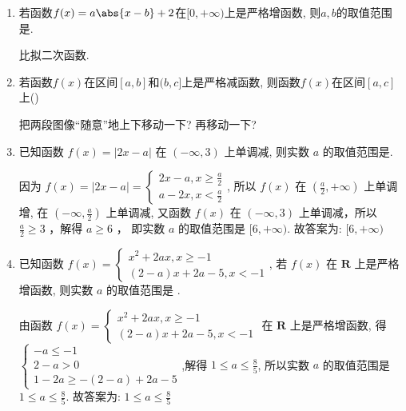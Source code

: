 \begin{enumerate}
\item 若函数$f(x)=a\abs{x-b}+2$在$[0,+\infty)$上是严格增函数, 则$a,b$的取值范围是. 
\begin{jieda}
比拟二次函数. 
\end{jieda}


\item 若函数$f(x)$在区间$[a,b]$和$(b,c]$上是严格减函数, 则函数$f(x)$在区间$[a,c]$上\dotfill()
\begin{jieda}
把两段图像``随意''地上下移动一下? 再移动一下? 
\end{jieda}

\item 已知函数 $f(x)=|2 x-a|$ 在 $(-\infty, 3)$ 上单调减, 则实数 $a$ 的取值范围是\blkda{$[6,+\infty)$}.
\begin{jieda}
因为 $f(x)=|2 x-a|=\left\{\begin{array}{l}2 x-a, x \geq \frac{a}{2} \\ a-2 x, x<\frac{a}{2}\end{array}\right.$,
所以 $f(x)$ 在 $\left(\frac{a}{2},+\infty\right)$ 上单调增, 在 $\left(-\infty, \frac{a}{2}\right)$ 上单调减,
又函数 $f(x)$ 在 $(-\infty, 3)$ 上单调减，所以 $\frac{a}{2} \geq 3$ ，解得 $a \geq 6$ ，
即实数 $a$ 的取值范围是 $[6,+\infty)$.
故答案为: $[6,+\infty)$
\end{jieda}

\item 已知函数 $f(x)=\left\{\begin{array}{l}x^{2}+2 a x, x \geq-1 \\ (2-a) x+2 a-5, x<-1\end{array}\right.$, 若 $f(x)$ 在 $\mathbf{R}$ 上是严格增函数, 则实数 $a$ 的取值范围是 .
\begin{jieda}
由函数 $f(x)=\left\{\begin{array}{l}x^{2}+2 a x, x \geq-1 \\ (2-a) x+2 a-5, x<-1\end{array}\right.$ 在 $\mathbf{R}$ 上是严格增函数, 得 $\left\{\begin{array}{l}-a \leq-1 \\ 2-a>0 \\ 1-2 a \geq-(2-a)+2 a-5\end{array}\right.$,解得 $1 \leq a \leq \frac{8}{5}$,
所以实数 $a$ 的取值范围是 $1 \leq a \leq \frac{8}{5}$.
故答案为: $1 \leq a \leq \frac{8}{5}$
\end{jieda}



\end{enumerate}
